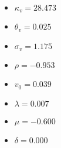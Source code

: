 
\begin{itemize}
    \item $\kappa_v = 28.473$
    \item $\theta_v = 0.025$
    \item $\sigma_v = 1.175$
    \item $\rho = -0.953$
    \item $v_0 = 0.039$
    \item $\lambda = 0.007$
    \item $\mu = -0.600$
    \item $\delta = 0.000$
\end{itemize}
